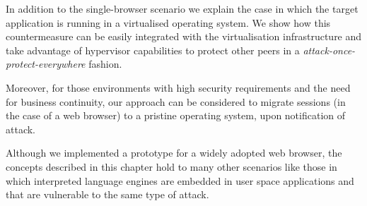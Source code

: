 In addition to the single-browser scenario we explain the case in which the target application is running in a virtualised operating system. We show how this countermeasure can be easily integrated with the virtualisation infrastructure and take advantage of hypervisor capabilities to protect other peers in a \emph{attack-once-protect-everywhere} fashion. 

Moreover, for those environments with high security requirements and the need for business continuity, our approach can be considered to migrate sessions (in the case of a web browser) to a pristine operating system, upon notification of attack.

Although we implemented a prototype for a widely adopted web browser, the concepts described in this chapter hold to many other scenarios like those in which interpreted language engines are embedded in user space applications and that are vulnerable to the same type of attack. 
